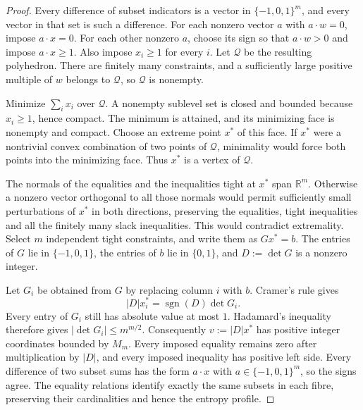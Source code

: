 \documentclass[11pt,a4paper]{article}
\numberwithin{equation}{section}
\theoremstyle{remark}
\newcommand{\R}{\mathbb R}
\newcommand{\sgn}{\operatorname{sgn}}
\begin{document}
\begin{proof}
Every difference of subset indicators is a vector in $\{-1,0,1\}^m$, and every vector in that set is such a difference. For each nonzero vector $a$ with $a\cdot w=0$, impose $a\cdot x=0$. For each other nonzero $a$, choose its sign so that $a\cdot w>0$ and impose $a\cdot x\ge1$. Also impose $x_i\ge1$ for every $i$. Let $\mathcal Q$ be the resulting polyhedron. There are finitely many constraints, and a sufficiently large positive multiple of $w$ belongs to $\mathcal Q$, so $\mathcal Q$ is nonempty.

Minimize $\sum_i x_i$ over $\mathcal Q$. A nonempty sublevel set is closed and bounded because $x_i\ge1$, hence compact. The minimum is attained, and its minimizing face is nonempty and compact. Choose an extreme point $x^*$ of this face. If $x^*$ were a nontrivial convex combination of two points of $\mathcal Q$, minimality would force both points into the minimizing face. Thus $x^*$ is a vertex of $\mathcal Q$.

The normals of the equalities and the inequalities tight at $x^*$ span $\R^m$. Otherwise a nonzero vector orthogonal to all those normals would permit sufficiently small perturbations of $x^*$ in both directions, preserving the equalities, tight inequalities and all the finitely many slack inequalities. This would contradict extremality. Select $m$ independent tight constraints, and write them as $Gx^*=b$. The entries of $G$ lie in $\{-1,0,1\}$, the entries of $b$ lie in $\{0,1\}$, and $D:=\det G$ is a nonzero integer.

Let $G_i$ be obtained from $G$ by replacing column $i$ with $b$. Cramer's rule gives
\[
 |D|x_i^*=\sgn(D)\det G_i.
\]
Every entry of $G_i$ still has absolute value at most $1$. Hadamard's inequality therefore gives $|\det G_i|\le m^{m/2}$. Consequently $v:=|D|x^*$ has positive integer coordinates bounded by $M_m$.
Every imposed equality remains zero after multiplication by $|D|$, and every imposed inequality has positive left side. Every difference of two subset sums has the form $a\cdot x$ with $a\in\{-1,0,1\}^m$, so the signs agree. The equality relations identify exactly the same subsets in each fibre, preserving their cardinalities and hence the entropy profile.
\end{proof}
\end{document}
